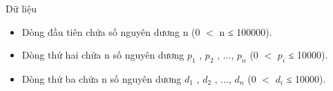 Dữ liệu  
\begin{itemize}
	\item     Dòng đầu tiên chứa số nguyên dương n (0 $<$ n ≤ 100000).   
	\item     Dòng thứ hai chứa n số nguyên dương $p_{1}$    , $p_{2}$    , ..., $p_{n}$    (0 $<$ $p_{i}$    ≤ 10000).   
	\item     Dòng thứ ba chứa n số nguyên dương $d_{1}$    , $d_{2}$    , ..., $d_{n}$    (0 $<$ $d_{i}$    ≤ 10000).   
\end{itemize}